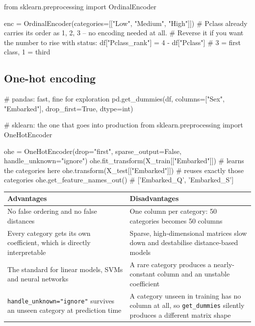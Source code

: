 \documentclass[11pt,a4paper]{article}
\begin{document}

\begin{py}
from sklearn.preprocessing import OrdinalEncoder

enc = OrdinalEncoder(categories=[["Low", "Medium", "High"]])
# Pclass already carries its order as 1, 2, 3 -- no encoding needed at all.
# Reverse it if you want the number to rise with status:
df["Pclass_rank"] = 4 - df["Pclass"]     # 3 = first class, 1 = third
\end{py}

\subsection{One-hot encoding}


\begin{py}
# pandas: fast, fine for exploration
pd.get_dummies(df, columns=["Sex", "Embarked"], drop_first=True, dtype=int)

# sklearn: the one that goes into production
from sklearn.preprocessing import OneHotEncoder

ohe = OneHotEncoder(drop="first", sparse_output=False, handle_unknown="ignore")
ohe.fit_transform(X_train[["Embarked"]])   # learns the categories here
ohe.transform(X_test[["Embarked"]])        # reuses exactly those categories
ohe.get_feature_names_out()                # ['Embarked_Q', 'Embarked_S']
\end{py}

\begin{tabularx}{\textwidth}{@{}X X@{}}
\toprule
\rowcolor{tablehead} \textbf{Advantages} & \textbf{Disadvantages} \\
\midrule
No false ordering and no false distances & One column per category: 50 categories becomes 50 columns \\
Every category gets its own coefficient, which is directly interpretable & Sparse, high-dimensional matrices slow down and destabilise distance-based models \\
The standard for linear models, SVMs and neural networks & A rare category produces a nearly-constant column and an unstable coefficient \\
\lstinline|handle_unknown="ignore"| survives an unseen category at prediction time & A category unseen in training has no column at all, so \lstinline|get_dummies| silently produces a different matrix shape \\
\bottomrule
\end{tabularx}
\end{document}
